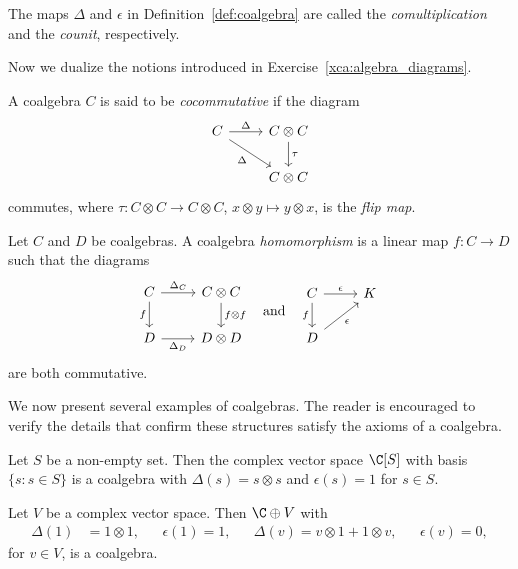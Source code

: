 The maps $\Delta$ and $\epsilon$ in Definition~\ref{def:coalgebra}
are called the \emph{comultiplication} and the \emph{counit}, respectively. 

Now we dualize the notions introduced in Exercise~\ref{xca:algebra_diagrams}.

\begin{definition}
A coalgebra $C$ is said to be \emph{cocommutative} if 
the diagram 
\[
    \begin{tikzcd}
C \arrow[r, "\Delta"] \arrow[dr, "\Delta"'] & C \otimes C \arrow[d, "\tau"] \\
& C \otimes C
\end{tikzcd}
\]
commutes, where $\tau\colon C\otimes C\to C\otimes C$, $x\otimes y\mapsto y\otimes x$, is the \emph{flip map}. 
\end{definition}

\begin{definition}
Let $C$ and $D$ be coalgebras. A coalgebra \emph{homomorphism}
is a linear map $f\colon C\to D$ such that 
the diagrams 
\[
\begin{tikzcd}
C \arrow[r, "\Delta_C"] \arrow[d, "f"'] & C \otimes C \arrow[d, "f \otimes f"] \\
D \arrow[r, "\Delta_D"'] & D \otimes D
\end{tikzcd}
\quad\text{and}\quad 
\begin{tikzcd}
C \arrow[r, "\epsilon"] \arrow[d, "f"'] & K \\
D \arrow[ur, "\epsilon"'] 
\end{tikzcd}
\]
are both commutative. 
\end{definition}

We now present several examples of coalgebras.
The reader is encouraged to verify the details that confirm these structures satisfy the axioms of a coalgebra.

\begin{example}
    Let $S$ be a non-empty set. Then the complex vector space $\C[S]$ with basis $\{s:s\in S\}$ is a coalgebra
    with $\Delta(s)=s\otimes s$ and 
    $\epsilon(s)=1$ for $s\in S$.
\end{example}

\begin{example}
    Let $V$ be a complex vector space. Then 
    $\C\oplus V$ with 
    \begin{align*}
        \Delta(1)&=1\otimes 1, && 
        \epsilon(1)=1, &&
        \Delta(v)=v\otimes 1+1\otimes v, && 
        \epsilon(v)=0,
    \end{align*}
    for $v\in V$, is a coalgebra. 
\end{example}

